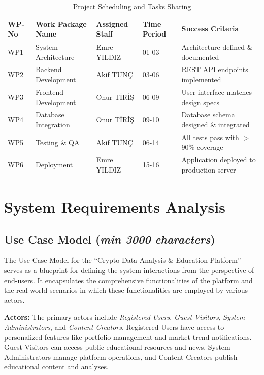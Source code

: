 \documentclass[12pt]{report}
\newcommand{\characters}[1]{(\textit{min #1 characters})}
\begin{document}
\begin{table}[h]
\centering
\begin{tabular}{|l|l|l|p{2cm}|p{4cm}|}
\hline
\textbf{WP-No} & \textbf{Work Package Name} & \textbf{Assigned Staff} & \textbf{Time Period} & \textbf{Success Criteria} \\ \hline
WP1            & System Architecture        & Emre YILDIZ             & 01-03                & Architecture defined \& documented \\ \hline
WP2            & Backend Development        & Akif TUNÇ             & 03-06                & REST API endpoints implemented \\ \hline
WP3            & Frontend Development       & Onur TİRİŞ             & 06-09                & User interface matches design specs \\ \hline
WP4            & Database Integration       & Onur TİRİŞ             & 09-10                & Database schema designed \& integrated \\ \hline
WP5            & Testing \& QA              & Akif TUNÇ             & 06-14                & All tests pass with $>$ 90\% coverage \\ \hline
WP6            & Deployment                 & Emre YILDIZ             & 15-16                & Application deployed to production server \\ \hline
\end{tabular}
\caption{Project Scheduling and Tasks Sharing}
\label{table:project_schedule}
\end{table}



\section{System Requirements Analysis}

\subsection{Use Case Model \characters{3000}}
The Use Case Model for the ``Crypto Data Analysis \& Education Platform'' serves as a blueprint for defining the system interactions from the perspective of end-users. It encapsulates the comprehensive functionalities of the platform and the real-world scenarios in which these functionalities are employed by various actors.

\textbf{Actors:} The primary actors include \textit{Registered Users}, \textit{Guest Visitors}, \textit{System Administrators}, and \textit{Content Creators}. Registered Users have access to personalized features like portfolio management and market trend notifications. Guest Visitors can access public educational resources and news. System Administrators manage platform operations, and Content Creators publish educational content and analyses.
\end{document}
